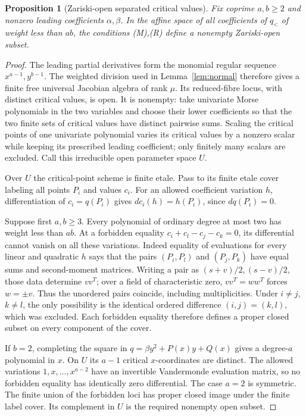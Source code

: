 \documentclass[11pt]{article}
\numberwithin{equation}{section}
\newtheorem{proposition}[proposition]{Proposition}
\theoremstyle{definition}
\theoremstyle{remark}
\begin{document}
\begin{proposition}[Zariski-open separated critical values]\label{prop:root-open}
Fix coprime $a,b\ge2$ and nonzero leading coefficients $\alpha,\beta$.
In the affine space of \emph{all} coefficients of $q_<$ of weight less than
$ab$, the conditions (M),(R) define a nonempty Zariski-open subset.
\end{proposition}
\begin{proof}
The leading partial derivatives form the monomial regular sequence
$x^{a-1},y^{b-1}$. The weighted division used in Lemma~\ref{lem:normal}
therefore gives a finite free universal Jacobian algebra of rank $\mu$.
Its reduced-fibre locus, with distinct critical values, is open. It is
nonempty: take univariate Morse polynomials in the two variables and choose
their lower coefficients so that the two finite sets of critical values
have distinct pairwise sums. Scaling the critical points of one univariate
polynomial varies its critical values by a nonzero scalar while keeping its
prescribed leading coefficient; only finitely many scalars are excluded.
Call this irreducible open parameter space $U$.

Over $U$ the critical-point scheme is finite etale. Pass to its finite etale
cover labeling all points $P_i$ and values $c_i$. For an allowed coefficient
variation $h$, differentiation of $c_i=q(P_i)$ gives
$dc_i(h)=h(P_i)$, since $dq(P_i)=0$.

Suppose first $a,b\ge3$. Every polynomial of ordinary degree at most two
has weight less than $ab$. At a forbidden equality
$c_i+c_l-c_j-c_k=0$, its differential cannot vanish on all these variations.
Indeed equality of evaluations for every linear and quadratic $h$ says
that the pairs $(P_i,P_l)$ and $(P_j,P_k)$ have equal sums and second-moment
matrices. Writing a pair as $(s+v)/2,(s-v)/2$, those data determine $vv^T$;
over a field of characteristic zero, $vv^T=ww^T$ forces $w=\pm v$.
Thus the unordered pairs coincide, including multiplicities. Under
$i\ne j$, $k\ne l$, the only possibility is the identical ordered
difference $(i,j)=(k,l)$, which was excluded. Each forbidden equality
therefore defines a proper closed subset on every component of the cover.

If $b=2$, completing the square in
$q=\beta y^2+P(x)y+Q(x)$ gives a degree-$a$ polynomial in $x$.
On $U$ its $a-1$ critical $x$-coordinates are distinct. The allowed
variations $1,x,\ldots,x^{a-2}$ have an invertible Vandermonde evaluation
matrix, so no forbidden equality has identically zero differential.
The case $a=2$ is symmetric. The finite union of the forbidden loci has
proper closed image under the finite label cover. Its complement in $U$
is the required nonempty open subset.
\end{proof}
\end{document}
